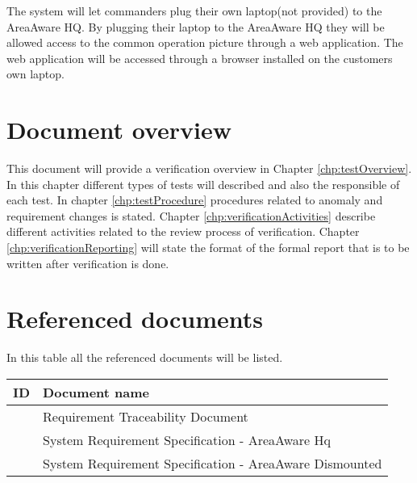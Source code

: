 The system will let commanders plug their own laptop(not provided) to the AreaAware HQ.
By plugging their laptop to the AreaAware HQ they will be allowed access to the common operation picture through a web application. 
The web application will be accessed through a browser installed on the customers own laptop.


\section{Document overview}
This document will provide a verification overview in Chapter  \ref{chp:testOverview}. In this chapter different types of tests will described and also the responsible of each test. In chapter \ref{chp:testProcedure} procedures related to anomaly and requirement changes is stated. Chapter \ref{chp:verificationActivities} describe different activities related to the review process of verification. Chapter \ref{chp:verificationReporting} will state the format of the formal report that is to be written after verification is done.


\section{Referenced documents}
In this table all the referenced documents will be listed.

\begin{tabular}{b{6cm} b{7cm}}
	\textbf{ID} & \textbf{Document name} \\
	\hline
	\rtm & Requirement Traceability Document \\
	\srshq & System Requirement Specification - AreaAware Hq \\
	\srsdis & System Requirement Specification - AreaAware Dismounted \\
\end{tabular}